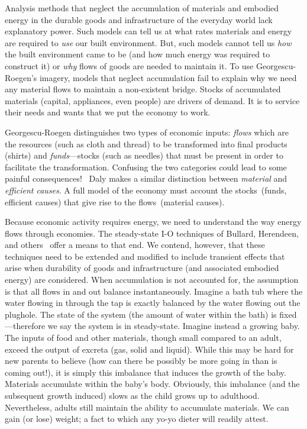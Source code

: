 Analysis methods that neglect the accumulation 
of materials
and embodied energy
in the durable goods and infrastructure 
of the everyday world lack explanatory power. 
Such models can tell us at what rates materials 
and energy are required 
to \emph{use} our built environment. 
But, such models cannot tell us \emph{how} 
the built environment came to be 
(and how much energy was required to construct it) 
or \emph{why} flows of goods are needed to maintain it. 
To use Georgescu-Roegen's imagery, 
models that neglect accumulation
fail to explain 
why we need any material flows to maintain a non-existent bridge. 
Stocks of accumulated materials 
(capital, appliances, even people) 
are drivers of demand. 
It is to service their needs and wants that we put the economy to work. 

Georgescu-Roegen distinguishes two types of economic
inputs: \emph{flows} which are the resources (such as cloth and thread)
to be transformed into final products (shirts) 
and \emph{funds}---stocks
(such as needles) that must be present in order to facilitate the transformation.
Confusing the two categories could lead to some painful 
consequences!~\cite{G-R1970}
Daly makes a similar distinction between \emph{material} 
and \emph{efficient causes}.\cite{Daly2006}
A full model of the economy must account the 
stocks~(funds, efficient causes) that give rise
to the flows~(material causes).

Because economic activity requires energy, 
we need to understand the way energy flows through economies. 
The steady-state I-O techniques of Bullard, Herendeen, 
and others~\cite{Bullard1975,Herendeen1978} 
offer a means to that end. 
We contend, however, that these techniques 
need to be extended and modified 
to include transient effects 
that arise when durability of goods and infrastructure 
(and associated embodied energy) are considered. 
When accumulation is not accounted for,
the assumption is that all flows in and out balance
instantaneously.
Imagine a bath tub where the water flowing in
through the tap is exactly balanced by the water
flowing out the plughole.
The state of the system 
(the amount of water within the bath) is 
fixed---therefore we say the system is in
steady-state.
Imagine instead a growing baby.
The inputs of food and other materials,
though small compared to an adult,
exceed the output of excreta
(gas, solid and liquid).
While this may be hard for new parents to believe
(how can there be possibly be more going in than is coming out!),
it is simply this imbalance that induces the growth of the baby.
Materials accumulate within the baby's body.
Obviously, 
this imbalance (and the subsequent growth induced)
slows as the child grows up to adulthood.
Nevertheless,
adults still maintain the ability to accumulate
materials.
We can gain (or lose) weight;
a fact to which any yo-yo dieter will readily attest.


